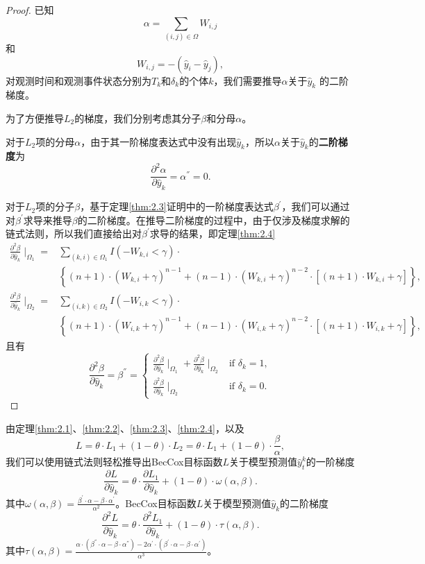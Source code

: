 \begin{proof}
已知$$\alpha = \sum_{(i,j)\in \Omega} W_{i,j}$$ 和 $$W_{i,j}=-(\hat{y}_i-\hat{y}_j),$$对观测时间和观测事件状态分别为$T_k$和$\delta_k$的个体$k$，我们需要推导$\alpha$关于$\hat{y}_k$ 的二阶梯度。

为了方便推导$L_2$的梯度，我们分别考虑其分子$\beta$和分母$\alpha$。

对于$L_2$项的分母$\alpha$，由于其一阶梯度表达式中没有出现$\hat{y}_k$，所以$\alpha$关于$\hat{y}_k$的\textbf{二阶梯度}为$$
\frac{\partial^2 \alpha}{\partial \hat{y}_k}=\alpha^{''}=0.
$$

对于$L_2$项的分子$\beta$，基于定理\ref{thm:2.3}证明中的一阶梯度表达式$\beta^{'}$，我们可以通过对$\beta^{'}$求导来推导$\beta$的二阶梯度。在推导二阶梯度的过程中，由于仅涉及梯度求解的链式法则，所以我们直接给出对$\beta^{'}$求导的结果，即定理\ref{thm:2.4}\[
\begin{split}
\frac{\partial^2 \beta}{\partial \hat{y}_k} \mid_{\Omega_1} =& \sum\limits_{(k,i)\in \Omega_1} I(-W_{k,i}<\gamma)\cdot \\
  & \left\{(n+1)\cdot (W_{k,i}+\gamma)^{n-1} + (n-1)\cdot (W_{k,i}+\gamma)^{n-2}\cdot [(n+1)\cdot W_{k,i}+\gamma]\right\}, \\
\frac{\partial^2 \beta}{\partial \hat{y}_k} \mid_{\Omega_2} =& \sum\limits_{(i,k)\in \Omega_2} I(-W_{i,k}<\gamma)\cdot \\
  & \left\{(n+1)\cdot (W_{i,k}+\gamma)^{n-1} + (n-1)\cdot (W_{i,k}+\gamma)^{n-2}\cdot [(n+1)\cdot W_{i,k}+\gamma]\right\},
\end{split}
\] 且有$$
\frac{\partial^2 \beta}{\partial \hat{y}_k}=\beta^{''}=
\begin{cases}
\frac{\partial^2 \beta}{\partial \hat{y}_k} \mid_{\Omega_1} + \frac{\partial^2 \beta}{\partial \hat{y}_k} \mid_{\Omega_2} & \text{if } \delta_k = 1,\\
\frac{\partial^2 \beta}{\partial \hat{y}_k} \mid_{\Omega_2} & \text{if } \delta_k = 0.
\end{cases}
$$
\end{proof}

由定理\ref{thm:2.1}、\ref{thm:2.2}、\ref{thm:2.3}、\ref{thm:2.4}，以及
\begin{equation}
L=\theta\cdot L_1 + (1-\theta)\cdot L_2= \theta\cdot L_1 + (1-\theta)\cdot \frac{\beta}{\alpha},
\end{equation}
我们可以使用链式法则轻松推导出BecCox目标函数$L$关于模型预测值$\hat{y}_t^k$的一阶梯度
\begin{equation}
\frac{\partial L}{\partial \hat{y}_k}=\theta\cdot \frac{\partial L_1}{\partial \hat{y}_k} + (1-\theta)\cdot \omega(\alpha, \beta).
\end{equation}
其中$\omega(\alpha, \beta)=\frac{\beta^{'}\cdot \alpha - \beta\cdot \alpha^{'}}{\alpha^2}$。BecCox目标函数$L$关于模型预测值$\hat{y}_k$的二阶梯度
\begin{equation}
\frac{\partial^2 L}{\partial \hat{y}_k}=\theta\cdot \frac{\partial^2 L_1}{\partial \hat{y}_k} + (1-\theta)\cdot \tau(\alpha, \beta).
\end{equation} 
其中$\tau(\alpha, \beta)=\frac{\alpha\cdot (\beta^{''}\cdot \alpha - \beta\cdot \alpha^{''})-2\alpha^{'}\cdot (\beta^{'}\cdot \alpha - \beta\cdot \alpha^{'})}{\alpha^3}$。

